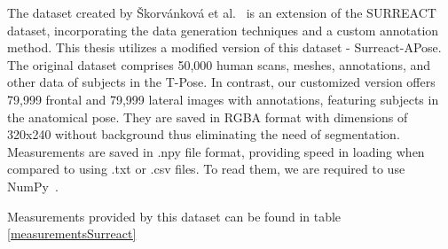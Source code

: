 The dataset created by Škorvánková et al.~\cite{super} is an extension of the SURREACT dataset, incorporating the data generation techniques and a custom annotation method. This thesis utilizes a modified version of this dataset - Surreact-APose. The original dataset comprises 50,000 human scans, meshes, annotations, and other data of subjects in the T-Pose. In contrast, our customized version offers 79,999 frontal and 79,999 lateral images with annotations, featuring subjects in the anatomical pose.  They are saved in RGBA format with dimensions of 320x240 without background thus eliminating the need of segmentation. Measurements are saved in .npy file format, providing speed in loading when compared to using .txt or .csv files. To read them, we are required to use NumPy~\cite{numpy}.

Measurements provided by this dataset can be found in table \ref{measurementsSurreact}

